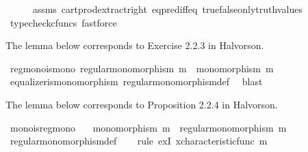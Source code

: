 \begin{isabellebody}
%
\isadelimproof
\ \ \ \ %
\endisadelimproof
%
\isatagproof
{}\isamarkupfalse%
\ assms\ cart{\isacharunderscore}{\kern0pt}prod{\isacharunderscore}{\kern0pt}extract{\isacharunderscore}{\kern0pt}right\ eq{\isacharunderscore}{\kern0pt}pred{\isacharunderscore}{\kern0pt}iff{\isacharunderscore}{\kern0pt}eq\ true{\isacharunderscore}{\kern0pt}false{\isacharunderscore}{\kern0pt}only{\isacharunderscore}{\kern0pt}truth{\isacharunderscore}{\kern0pt}values\ \ \isamarkupfalse%
\ {\isacharparenleft}{\kern0pt}typecheck{\isacharunderscore}{\kern0pt}cfuncs{\isacharcomma}{\kern0pt}\ fastforce{\isacharparenright}{\kern0pt}%
\endisatagproof
{\isafoldproof}%
%
\isadelimproof
%
\endisadelimproof
%
\isadelimdocument
%
\endisadelimdocument
%
\isatagdocument
%
\isamarkuptrue%
%
\endisatagdocument
{\isafolddocument}%
%
\isadelimdocument
%
\endisadelimdocument
%
\begin{isamarkuptext}%
The lemma below corresponds to Exercise 2.2.3 in Halvorson.%
\end{isamarkuptext}\isamarkuptrue%
\isamarkupfalse%
\ regmono{\isacharunderscore}{\kern0pt}is{\isacharunderscore}{\kern0pt}mono{\isacharcolon}{\kern0pt}\ {\isachardoublequoteopen}regular{\isacharunderscore}{\kern0pt}monomorphism\ m\ {\isasymLongrightarrow}\ monomorphism\ m{\isachardoublequoteclose}\isanewline
%
\isadelimproof
\ \ %
\endisadelimproof
%
\isatagproof
{}\isamarkupfalse%
\ equalizer{\isacharunderscore}{\kern0pt}is{\isacharunderscore}{\kern0pt}monomorphism\ regular{\isacharunderscore}{\kern0pt}monomorphism{\isacharunderscore}{\kern0pt}def\ \isamarkupfalse%
\ blast%
\endisatagproof
{\isafoldproof}%
%
\isadelimproof
%
\endisadelimproof
%
\begin{isamarkuptext}%
The lemma below corresponds to Proposition 2.2.4 in Halvorson.%
\end{isamarkuptext}\isamarkuptrue%
\isamarkupfalse%
\ mono{\isacharunderscore}{\kern0pt}is{\isacharunderscore}{\kern0pt}regmono{\isacharcolon}{\kern0pt}\isanewline
\ \ \ {\isachardoublequoteopen}monomorphism\ m\ {\isasymLongrightarrow}\ regular{\isacharunderscore}{\kern0pt}monomorphism\ m{\isachardoublequoteclose}\isanewline
%
\isadelimproof
\ \ %
\endisadelimproof
%
\isatagproof
{}\isamarkupfalse%
\ regular{\isacharunderscore}{\kern0pt}monomorphism{\isacharunderscore}{\kern0pt}def\isanewline
\ \ \isamarkupfalse%
\ {\isacharparenleft}{\kern0pt}rule\ exI{\isacharbrackleft}{\kern0pt}\ x{\isacharequal}{\kern0pt}{\isachardoublequoteopen}characteristic{\isacharunderscore}{\kern0pt}func\ m{\isachardoublequoteclose}{\isacharbrackright}{\kern0pt}{\isacharcomma}{\kern0pt}\ \isanewline

\end{isabellebody}
